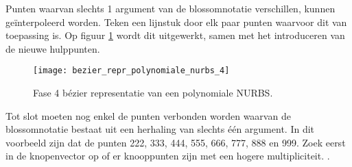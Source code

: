 \begin{itemize}
{\begin{itemize}
			Punten waarvan slechts 1 argument van de blossomnotatie verschillen, kunnen geïnterpoleerd worden. Teken een lijnstuk door elk paar punten waarvoor dit van toepassing is. Op figuur \ref{fig:bezier_repr_polynomiale_nurbs_4} wordt dit uitgewerkt, samen met het introduceren van de nieuwe hulppunten.
			\begin{figure}[ht]
				\centering
				\texttt{[image: bezier\_repr\_polynomiale\_nurbs\_4]}	
				\caption{Fase 4 bézier representatie van een polynomiale NURBS.}
				\label{fig:bezier_repr_polynomiale_nurbs_4}
			\end{figure}

			Tot slot moeten nog enkel de punten verbonden worden waarvan de blossomnotatie bestaat uit een herhaling van slechts één argument. In dit voorbeeld zijn dat de punten 222, 333, 444, 555, 666, 777, 888 en 999. Zoek eerst in de knopenvector op of er knooppunten zijn met een hogere multipliciteit. .
			

\end{itemize}}
\end{itemize}

